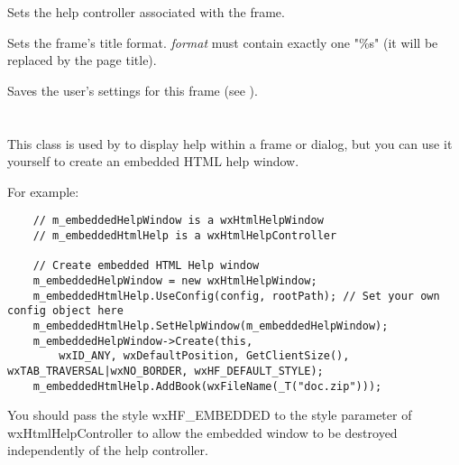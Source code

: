 \label{wxhtmlhelpframesetcontroller}


Sets the help controller associated with the frame.

\label{wxhtmlhelpframesettitleformat}


Sets the frame's title format. {\it format} must contain exactly one "\%s"
(it will be replaced by the page title).

\label{wxhtmlhelpframewritecustomization}


Saves the user's settings for this frame (see ).

\section{}\label{wxhtmlhelpwindow}

This class is used by  
to display help within a frame or dialog, but you can use it yourself to create an embedded HTML help window.

For example:

\begin{verbatim}
    // m_embeddedHelpWindow is a wxHtmlHelpWindow
    // m_embeddedHtmlHelp is a wxHtmlHelpController

    // Create embedded HTML Help window
    m_embeddedHelpWindow = new wxHtmlHelpWindow;
    m_embeddedHtmlHelp.UseConfig(config, rootPath); // Set your own config object here
    m_embeddedHtmlHelp.SetHelpWindow(m_embeddedHelpWindow);    
    m_embeddedHelpWindow->Create(this,
        wxID_ANY, wxDefaultPosition, GetClientSize(), wxTAB_TRAVERSAL|wxNO_BORDER, wxHF_DEFAULT_STYLE);        
    m_embeddedHtmlHelp.AddBook(wxFileName(_T("doc.zip")));
\end{verbatim}

You should pass the style wxHF\_EMBEDDED to the style parameter of wxHtmlHelpController to allow
the embedded window to be destroyed independently of the help controller.

